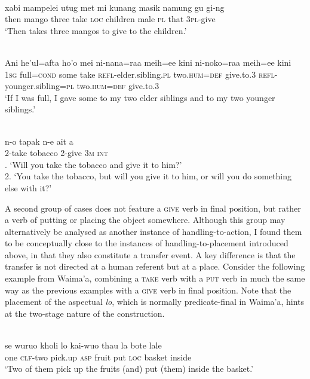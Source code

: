 \ea \label{}
\\
\gll xabi mampelei utug met mi kunang masik namung gu gi-ng \\
then mango three take \textsc{loc} children male \textsc{pl} that 3\textsc{pl}-give \\
\glft `Then takes three mangos to give to the children.'\\ 
\z

\ea \label{Makalero_6}
\\
\gll Ani he’ul=afta ho’o mei ni-nana=raa meih=ee kini ni-noko=raa meih=ee kini \\
1\textsc{sg} full=\textsc{cond} some take \textsc{refl}-elder.sibling.\textsc{pl} two.\textsc{hum}=\textsc{def} give.to.3 \textsc{refl}-younger.sibling=\textsc{pl} two.\textsc{hum}=\textsc{def} give.to.3 \\
\glft ‘If I was full, I gave some to my two elder siblings and to my two younger
siblings.’ \\ 
\z

\ea \label{Maybrat_77}
\\
\gll n-o tapak n-e ait a \\
2-take tobacco 2-give 3\textsc{m} \textsc{int} \\
. `Will you take the tobacco and give it to him?' \\ 2. `You take the tobacco, but will you give it to him, or will you do something else with it?' \\ 
\z

A second group of cases does not feature a \textsc{give} verb in final position, but rather a verb of putting or placing the object somewhere. Although this group may alternatively be analysed as another instance of handling-to-action, I found them to be conceptually close to the instances of handling-to-placement introduced above, in that they also constitute a transfer event. A key difference is that the transfer is not directed at a human referent but at a place. Consider the following example from Waima'a, combining a \textsc{take} verb with a \textsc{put} verb in much the same way as the previous examples with a \textsc{give} verb in final position. Note that the placement of the aspectual \textit{lo}, which is normally predicate-final in Waima'a, hints at the two-stage nature of the construction.

\ea \label{WMHP058}
\\
\gll se wuruo kholi lo kai-wuo thau la bote lale \\
one \textsc{clf}-two pick.up \textsc{asp} fruit put \textsc{loc} basket inside \\
\glft `Two of them pick up the fruits (and) put (them) inside the basket.'\\ 
\z

